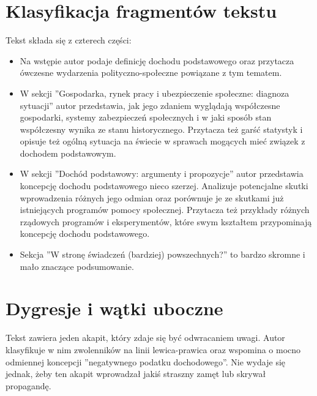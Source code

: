 \documentclass[11pt]{article}
\begin{document}
	\section{Klasyfikacja fragmentów tekstu}
		\par Tekst składa się z czterech części:
		\begin{itemize}
			\item Na wstępie autor podaje definicję dochodu podstawowego oraz przytacza ówczesne wydarzenia polityczno-społeczne powiązane z tym tematem.
			\item W sekcji ''Gospodarka, rynek pracy i ubezpieczenie społeczne: diagnoza sytuacji'' autor przedstawia, jak jego zdaniem wyglądają współczesne gospodarki, systemy zabezpieczeń społecznych i w jaki sposób stan współczesny wynika ze stanu historycznego. Przytacza też garść statystyk i opisuje też ogólną sytuacja na świecie w sprawach mogących mieć związek z dochodem podstawowym.
			\item W sekcji ''Dochód podstawowy: argumenty i propozycje'' autor przedstawia koncepcję dochodu podstawowego nieco szerzej. Analizuje potencjalne skutki wprowadzenia różnych jego odmian oraz porównuje je ze skutkami już istniejących programów pomocy społecznej. Przytacza też przykłady różnych rządowych programów i eksperymentów, które swym kształtem przypominają koncepcję dochodu podstawowego.
			\item Sekcja ''W stronę świadczeń (bardziej) powszechnych?'' to bardzo skromne i mało znaczące podsumowanie.
		\end{itemize}
	
	\section{Dygresje i wątki uboczne}
		\par Tekst zawiera jeden akapit, który zdaje się być odwracaniem uwagi. Autor klasyfikuje w nim zwolenników na linii lewica-prawica oraz wspomina o mocno odmiennej koncepcji ''negatywnego podatku dochodowego''. Nie wydaje się jednak, żeby ten akapit wprowadzał jakiś straszny zamęt lub skrywał propagandę.
		
\end{document}
